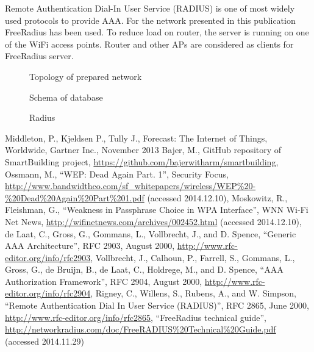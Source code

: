 \documentclass{llncs}
\begin{document}
Remote Authentication Dial-In User Service (RADIUS) \cite{rfc2865} is one of
most widely used protocols to provide AAA. For the network presented in this
publication FreeRadius \cite{freeRadius} has been used. To reduce load on
router, the server is running on one of the WiFi access points. Router and other
APs are considered as clients for FreeRadius server. 

\begin{figure}
\vspace{-15pt}
\caption{Topology of prepared network}
\end{figure}

\begin{figure}
\vspace{-15pt}
\caption{Schema of database}
\end{figure}

\begin{figure}
\vspace{-15pt}
\caption{Radius}
\end{figure}

%
%
\begin{thebibliography}{}
%
Middleton, P., Kjeldsen P., Tully J., Forecast: The Internet of Things,
Worldwide, Gartner Inc., November 2013
Bajer, M., GitHub repository of SmartBuilding project, 
\url{https://github.com/bajerwitharm/smartbuilding},
Ossmann, M., ``WEP: Dead Again Part. 1'', Security Focus, 
\url{http://www.bandwidthco.com/sf_whitepapers/wireless/WEP%20-%20Dead%20Again%20Part%201.pdf}
(accessed 2014.12.10),
Moskowitz, R., Fleishman, G., ``Weakness in Passphrase Choice in WPA Interface'',
WNN Wi-Fi Net News, \url{http://wifinetnews.com/archives/002452.html} (accessed
2014.12.10),
de Laat, C., Gross, G., Gommans, L., Vollbrecht, J., and D. Spence, ``Generic AAA
Architecture'', RFC 2903, August 2000,
\url{http://www.rfc-editor.org/info/rfc2903},
Vollbrecht, J., Calhoun, P., Farrell, S., Gommans, L., Gross, G., de Bruijn, B.,
de Laat, C., Holdrege, M., and D. Spence, ``AAA Authorization Framework'', RFC
2904, August 2000, \url{http://www.rfc-editor.org/info/rfc2904},
Rigney, C., Willens, S., Rubens, A., and W. Simpson, ``Remote  Authentication
Dial In User Service (RADIUS)'', RFC 2865, June 2000,
\url{http://www.rfc-editor.org/info/rfc2865},
``FreeRadius technical guide'',
\url{http://networkradius.com/doc/FreeRADIUS%20Technical%20Guide.pdf} (accessed 2014.11.29)
\end{thebibliography}
\end{document}
